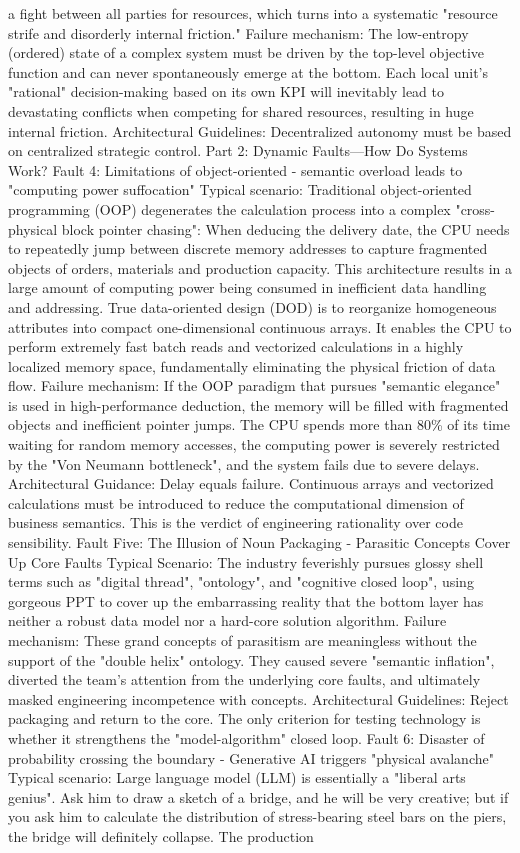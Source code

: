 \documentclass[11pt,a4paper]{article}
\begin{document}
a fight between all parties for resources, which turns into a systematic "resource strife and disorderly internal friction." Failure mechanism: The low-entropy (ordered) state of a complex system must be driven by the top-level objective function and can never spontaneously emerge at the bottom. Each local unit's "rational" decision-making based on its own KPI will inevitably lead to devastating conflicts when competing for shared resources, resulting in huge internal friction. Architectural Guidelines: Decentralized autonomy must be based on centralized strategic control. Part 2: Dynamic Faults—How Do Systems Work? Fault 4: Limitations of object-oriented - semantic overload leads to "computing power suffocation" Typical scenario: Traditional object-oriented programming (OOP) degenerates the calculation process into a complex "cross-physical block pointer chasing": When deducing the delivery date, the CPU needs to repeatedly jump between discrete memory addresses to capture fragmented objects of orders, materials and production capacity. This architecture results in a large amount of computing power being consumed in inefficient data handling and addressing. True data-oriented design (DOD) is to reorganize homogeneous attributes into compact one-dimensional continuous arrays. It enables the CPU to perform extremely fast batch reads and vectorized calculations in a highly localized memory space, fundamentally eliminating the physical friction of data flow. Failure mechanism: If the OOP paradigm that pursues "semantic elegance" is used in high-performance deduction, the memory will be filled with fragmented objects and inefficient pointer jumps. The CPU spends more than 80\% of its time waiting for random memory accesses, the computing power is severely restricted by the "Von Neumann bottleneck", and the system fails due to severe delays. Architectural Guidance: Delay equals failure. Continuous arrays and vectorized calculations must be introduced to reduce the computational dimension of business semantics. This is the verdict of engineering rationality over code sensibility. Fault Five: The Illusion of Noun Packaging - Parasitic Concepts Cover Up Core Faults Typical Scenario: The industry feverishly pursues glossy shell terms such as "digital thread", "ontology", and "cognitive closed loop", using gorgeous PPT to cover up the embarrassing reality that the bottom layer has neither a robust data model nor a hard-core solution algorithm. Failure mechanism: These grand concepts of parasitism are meaningless without the support of the "double helix" ontology. They caused severe "semantic inflation", diverted the team's attention from the underlying core faults, and ultimately masked engineering incompetence with concepts. Architectural Guidelines: Reject packaging and return to the core. The only criterion for testing technology is whether it strengthens the "model-algorithm" closed loop. Fault 6: Disaster of probability crossing the boundary - Generative AI triggers "physical avalanche" Typical scenario: Large language model (LLM) is essentially a "liberal arts genius". Ask him to draw a sketch of a bridge, and he will be very creative; but if you ask him to calculate the distribution of stress-bearing steel bars on the piers, the bridge will definitely collapse. The production 
\end{document}
